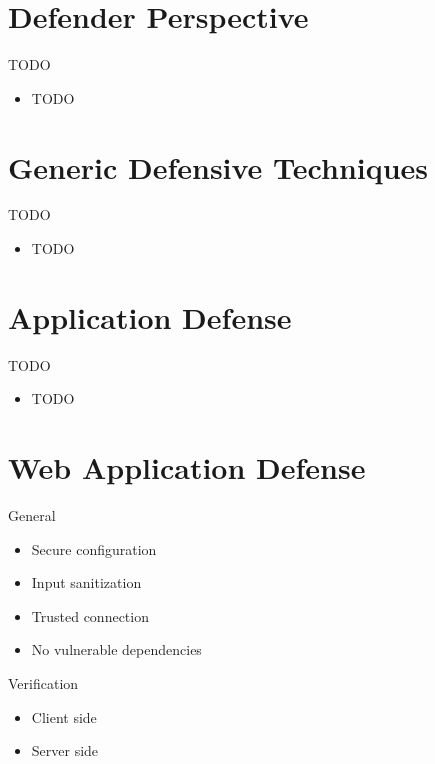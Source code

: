 \documentclass{curs}
\begin{document}
\section{Defender Perspective}

\begin{frame}{TODO}
  \begin{itemize}
    \item TODO
  \end{itemize}
\end{frame}


\section{Generic Defensive Techniques}

\begin{frame}{TODO}
  \begin{itemize}
    \item TODO
  \end{itemize}
\end{frame}


\section{Application Defense}

\begin{frame}{TODO}
  \begin{itemize}
    \item TODO
  \end{itemize}
\end{frame}


\section{Web Application Defense}

\begin{frame}{General}
  \begin{itemize}
    \item Secure configuration
    \item Input sanitization
    \item Trusted connection
    \item No vulnerable dependencies
  \end{itemize}
\end{frame}

\begin{frame}{Verification}
  \begin{itemize}
    \item Client side
    \item Server side
  \end{itemize}
\end{frame}
\end{document}
